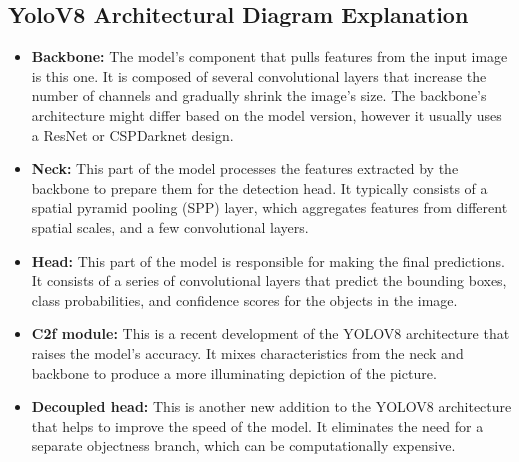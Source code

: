 \documentclass[12 pt]{report}
\begin{document}
\subsection{YoloV8 Architectural Diagram Explanation}
{
  \begin{justify}
  \begin{itemize}
    \item \textbf{Backbone:} The model's component that pulls features from the input image is this one. It is composed of several convolutional layers that increase the number of channels and gradually shrink the image's size. The backbone's architecture might differ based on the model version, however it usually uses a ResNet or CSPDarknet design.


    \item \textbf{Neck:} This part of the model processes the features extracted by the backbone to prepare them for the detection head. It typically consists of a spatial pyramid pooling (SPP) layer, which aggregates features from different spatial scales, and a few convolutional layers.

    \item \textbf{Head:} This part of the model is responsible for making the final predictions. It consists of a series of convolutional layers that predict the bounding boxes, class probabilities, and confidence scores for the objects in the image.

    \item \textbf{C2f module:} This is a recent development of the YOLOV8 architecture that raises the model's accuracy. It mixes characteristics from the neck and backbone to produce a more illuminating depiction of the picture.

    \item \textbf{Decoupled head:} This is another new addition to the YOLOV8 architecture that helps to improve the speed of the model. It eliminates the need for a separate objectness branch, which can be computationally expensive.
  \end{itemize}
  \end{justify}
}

%
%
\end{document}
